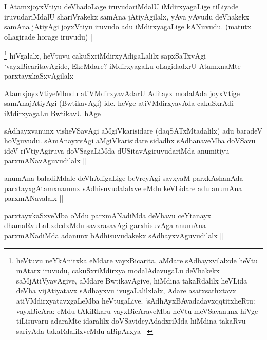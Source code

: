 \begin{artha}
I AtamxjoyxVtiyu deVhadoLage iruvudariMdalU iMdirxyagaLige tiLiyade iruvudariMdalU shariVrakekx samAna jAtiyAgilalx, yAva yAvudu deVhakekx samAna jAtiyAgi joyxVtiyu iruvudo adu iMdirxyagaLige kANuvudu. (matutx oLagirade horage iruvudu) ||
\end{artha}

\begin{artha}
\footnote{heVtuvu neYkAnitxka eMdare vayxBicarita, aMdare sAdhayxvilalxde heVtu mAtarx iruvudu, cakuSxriMdirxya modalAdavugaLu deVhakekx saMjAtiVyavAgive, aMdare BwtikavAgive, hiMdina takaRdalilx heVLida deVha vijAtiyatavx sAdhayxvu ivugaLalilxlalx, Adare asatxsathxtavx atiVMdirxyatavxgaLeMba heVtugaLive. `sAdhAyxBAvadadavxqqtitxheRtu: vayxBicAra: eMdu tAkiRkaru vayxBicAraveMba heVtu meVSavanunx hiVge tiLisuvaru adaraMte idaralilx doVSavideyAdadxriMda hiMdina takaRvu sariyAda takaRdalilxveMdu aBipArxya ||} hiVgalalx, heVtuvu cakuSxriMdirxyAdigaLalilx sapxSaTxvAgi `vayxBicaritavAgide, EkeMdare? iMdirxyagaLu oLagidadxrU AtamxnaMte parxtayxkaSxvAgilalx || 
\end{artha}

\begin{artha}
AtamxjoyxVtiyeMbudu atiVMdirxyavAdarU Aditayx modalAda joyxVtige samAnajAtiyAgi (BwtikavAgi) ide. heVge atiVMdirxyavAda cakuSxrAdi iMdirxyagaLu BwtikavU hAge ||
\end{artha}

\begin{artha}
sAdhayxvanunx visheVSavAgi aMgiVkarisidare (daqSATxMtadalilx) adu baradeV hoVguvudu. sAmAnayxvAgi aMgiVkarisidare sidadhx sAdhanaveMba doVSavu ideV riVtiyAgiruva doVSagaLiMda dUSitavAgiruvudariMda anumitiyu parxmANavAguvudilalx ||
\end{artha}

\begin{artha}
anumAna baladiMdale deVhAdigaLige beVreyAgi savxyaM parxkAshanAda parxtayxgAtamxnanunx sAdhisuvudalalxve eMdu keVLidare adu anumAna parxmANavalalx ||
\end{artha}

\begin{artha}
parxtayxkaSxveMba oMdu parxmANadiMda deVhavu ceYtanayx dhamaRvuLaLxdedxMdu savxrasavAgi garxhisuvAga anumAna parxmANadiMda adanunx bAdhisuvudakekx sAdhayxvAguvudilalx ||
\end{artha}


